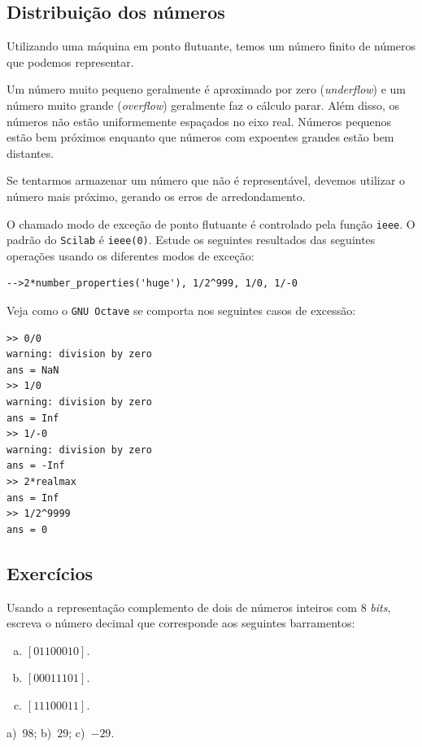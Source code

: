 \subsection{Distribuição dos números}
Utilizando uma máquina em ponto flutuante, temos um número finito de números que podemos representar.

Um número muito pequeno geralmente é aproximado por zero (\emph{underflow}) e um número muito grande (\emph{overflow}) geralmente faz o cálculo parar. Além disso, os números não estão uniformemente espaçados no eixo real. Números pequenos estão bem próximos enquanto que números com expoentes grandes estão bem distantes.

Se tentarmos armazenar um número que não é representável, devemos utilizar o número mais próximo, gerando os erros de arredondamento.

\ifisscilab
\begin{obs}
  O chamado modo de exceção de ponto flutuante é controlado pela função \verb+ieee+. O padrão do \verb+Scilab+ é \verb+ieee(0)+. Estude os seguintes resultados das seguintes operações usando os diferentes modos de exceção:
\begin{verbatim}
-->2*number_properties('huge'), 1/2^999, 1/0, 1/-0
\end{verbatim}
\end{obs}
\fi
\ifisoctave
\begin{obs}
  Veja como o \verb+GNU Octave+ se comporta nos seguintes casos de excessão:
\begin{verbatim}
>> 0/0
warning: division by zero
ans = NaN
>> 1/0
warning: division by zero
ans = Inf
>> 1/-0
warning: division by zero
ans = -Inf
>> 2*realmax
ans = Inf
>> 1/2^9999
ans = 0
\end{verbatim}
\end{obs}
\fi

\subsection*{Exercícios}

\begin{exer}
  Usando a representação complemento de dois de números inteiros com $8$ \emph{bits}, escreva o número decimal que corresponde aos seguintes barramentos:
  \begin{enumerate}[a)]
  \item $[01100010]$.
  \item $[00011101]$.
  \item $[11100011]$.
  \end{enumerate}
\end{exer}
\begin{resp}
  a)~$98$; b)~$29$; c)~$-29$.
\end{resp}

